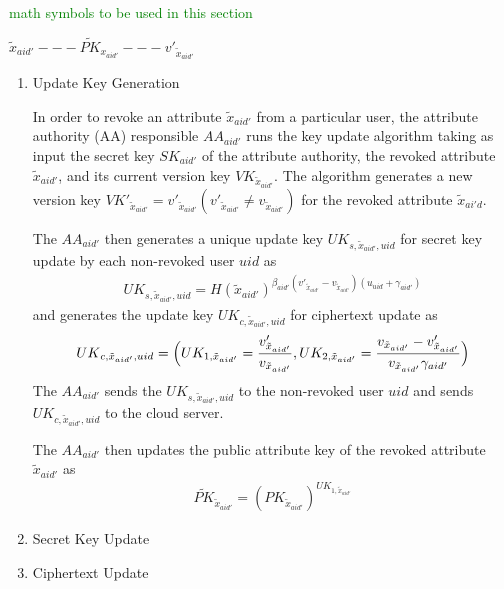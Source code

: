 \begin{enumerate}
	\textcolor{green}{math symbols to be used in this section}
	
	$
	\tilde{x}_{aid'}---\widetilde{PK}_{{x}_{aid'}}---v'_{\tilde{x}_{aid'}}
	$
	
	\begin{enumerate}
	\item Update Key Generation
	
	In order to revoke an attribute $\tilde{x}_{aid'}$ from a particular user, the attribute authority (AA) responsible $AA_{aid'}$ runs the key update algorithm taking as input the secret key $SK_{aid'}$ of the 
	attribute authority, the revoked attribute $\tilde{x}_{aid'}$, and its current version key $VK_{\tilde{x}_{aid'}}$.
	The algorithm generates a new version key $VK'_{\tilde{x}_{aid'}} = v'_{\tilde{x}_{aid'}} (v'_{\tilde{x}_{aid'}} \neq v_{\tilde{x}_{aid'}})$ for the revoked attribute $\tilde{x}_{ai'd}$.
	
	The $AA_{aid'}$ then generates a unique update key ${UK}_{s,\tilde{x}_{aid'},uid}$ for secret key update by each non-revoked user $uid$ as
	\begin{align*}
		{UK}_{s,\tilde{x}_{aid'},uid} = H(\tilde{x}_{aid'})^{\beta_{aid'}(v'_{\tilde{x}_{aid'}}-v_{\tilde{x}_{aid'}})(u_{uid}+\gamma_{aid'})}
	\end{align*}
	and generates the update key ${UK}_{c,\tilde{x}_{aid'},uid}$ for ciphertext update as
	\begin{align*}
		{UK}_{c,\tilde{x}_{aid'},uid} =\Bigl( UK_{1,\tilde{x}_{aid'}} = \frac{v'_{\tilde{x}_{aid'}}}{v_{\tilde{x}_{aid'}}}, UK_{2,\tilde{x}_{aid'}} = \frac{v_{\tilde{x}_{aid'}} - v'_{\tilde{x}_{aid'}}}{v_{\tilde{x}_{aid'}}\gamma_{aid'}} \Bigl)
	\end{align*}
	The $AA_{aid'}$ sends the ${UK}_{s,\tilde{x}_{aid'},uid}$ to the non-revoked user $uid$ and sends ${UK}_{c,\tilde{x}_{aid'},uid}$ to the cloud server.
	
	The $AA_{aid'}$ then updates the public attribute key of the revoked attribute $\tilde{x}_{aid'}$ as
	\begin{align*}
		\widetilde{PK}_{\tilde{x}_{aid'}} = ({PK}_{\tilde{x}_{aid'}})^{UK_{1,\tilde{x}_{aid'}}}
	\end{align*}
	
	
	\item Secret Key Update
	
	\item Ciphertext Update
	\end{enumerate}
	
\end{enumerate}
